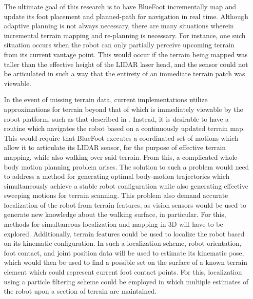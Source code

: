 The ultimate goal of this research is to have BlueFoot incrementally map and update its foot placement and planned-path for navigation in real time. Although adaptive planning is not always necessary, there are many situations wherein incremental terrain mapping and re-planning is necessary. For instance, one such situation occurs when the robot can only partially perceive upcoming terrain from its current vantage point. This would occur if the terrain being mapped was taller than the effective height of the LIDAR laser head, and the sensor could not be articulated in such a way that the entirety of an immediate terrain patch was viewable. 


In the event of missing terrain data, current implementations utilize approximations for terrain beyond that of which is immediately viewable by the robot platform, such as that described in \cite{Kolter2009}. Instead, it is desirable to have a routine which navigates the robot based on a continuously updated terrain map. This would require that BlueFoot executes a coordinated set of motions which allow it to articulate its LIDAR sensor, for the purpose of effective terrain mapping, while also walking over said terrain. From this, a complicated whole-body motion planning problem arises. The solution to such a problem would need to address a method for generating optimal body-motion trajectories which simultaneously achieve a stable robot configuration while also generating effective sweeping motions for terrain scanning. This problem also demand accurate localization of the robot from terrain features, as vision sensors would be used to generate new knowledge about the walking surface, in particular. For this, methods for simultaneous localization and mapping in 3D will have to be explored. Additionally, terrain features could be used to localize the robot based on its kinematic configuration. In such a localization scheme, robot orientation, foot contact, and joint position data will be used to estimate its kinematic pose, which would then be used to find a possible set on the surface of a known terrain element which could represent current foot contact points. For this, localization using a particle filtering scheme could be employed in which multiple estimates of the robot upon a section of terrain are maintained.